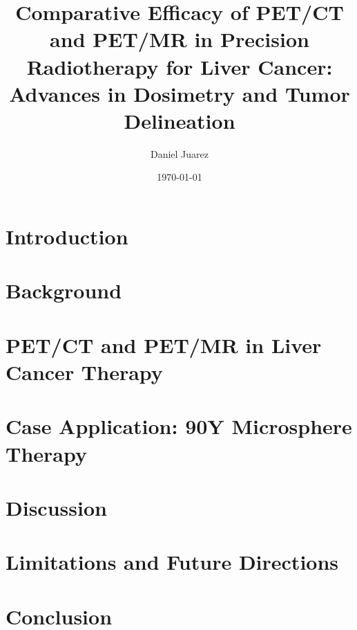 \documentclass[11pt]{article} %
\title{Comparative Efficacy of PET/CT and PET/MR in Precision Radiotherapy for Liver Cancer: Advances in Dosimetry and Tumor Delineation}
\author{Daniel Juarez}
\date{\today}
\begin{document}
\maketitle

\begin{multicols}{2}


\section{Introduction}


\section{Background}


\end{multicols}

\section{PET/CT and PET/MR in Liver Cancer Therapy}


\begin{multicols}{2}

\section{Case Application: 90Y Microsphere Therapy}


\section{Discussion}


\section{Limitations and Future Directions}


\section{Conclusion}


\end{multicols}



\end{document}

